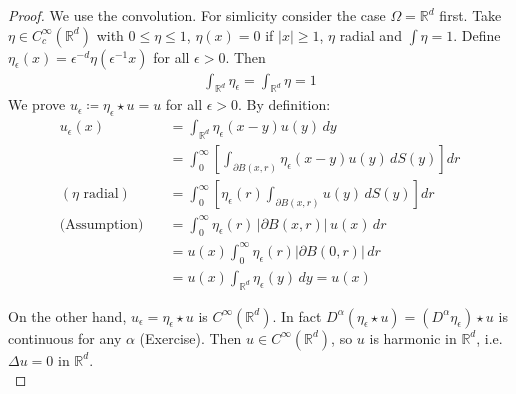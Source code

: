 \documentclass{report}
\theoremstyle{tommy}
\begin{document}
\begin{proof}
  We use the convolution. For simlicity consider the case \(\Omega = \mathbb{R}^d\) first. Take \(\eta \in C_c^\infty(\mathbb{R}^d)\) with \(0 \le \eta \le 1\), \(\eta(x) = 0\) if \(|x| \ge 1\), \(\eta\) radial and \(\int \eta = 1\). Define \(\eta_\epsilon (x) = \epsilon^{-d} \eta(\epsilon^{-1} x)\) for all \(\epsilon > 0\). Then
  \begin{align*}
    \int_{\mathbb{R}^d} \eta_\epsilon = \int_{\mathbb{R}^d} \eta = 1
  \end{align*}
  We prove \(u_\epsilon \coloneqq \eta_\epsilon \star u = u\) for all \(\epsilon > 0\). By definition:
  \begin{align*}
    u_\epsilon(x) 
    &= \int_{\mathbb{R}^d} \eta_\epsilon(x-y)u(y) \, dy \\
    &= \int_0^\infty \left[\int_{\partial B(x, r)} \eta_\epsilon(x-y) u(y) \, dS(y)\right] dr \\
    (\eta \text{ radial}) \quad &= \int_0^\infty \left[\eta_\epsilon(r) \int_{\partial B(x, r)} u(y) \, dS(y)\right] dr \\
    \text{(Assumption)} \quad &= \int_0^\infty \eta_\epsilon(r)\, |\partial B(x, r)|\, u(x) \, dr \\
    &= u(x) \int_0^\infty \eta_\epsilon(r) |\partial B(0, r)| \, dr \\
    &= u(x) \int_{\mathbb{R}^d} \eta_\epsilon(y) \, dy = u(x)
  \end{align*}

  On the other hand, \(u_\epsilon = \eta_\epsilon \star u\) is \(C^\infty(\mathbb{R}^d)\). In fact \(D^\alpha(\eta_\epsilon \star u) = (D^\alpha \eta_\epsilon) \star u\) is continuous for any \(\alpha\) (Exercise). Then \(u \in C^\infty(\mathbb{R}^d)\), so \(u\) is harmonic in \(\mathbb{R}^d\), i.e. \(\Delta u = 0\) in \(\mathbb{R}^d\). \\


\end{proof}
\end{document}
